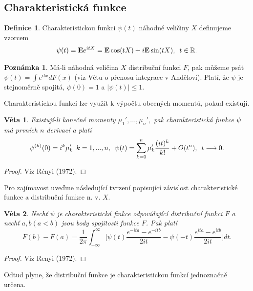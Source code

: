 \documentclass[a4]{report}
\newtheorem{theorem}{Věta}
\theoremstyle{definition}
\newtheorem{definition}{Definice}[section]
\newtheorem{remark}{Poznámka}[section]
\begin{document}
{\subsection{Charakteristická funkce}
\begin{definition}
Charakteristickou funkci $\psi(t)$ náhodné veličiny $X$ definujeme vzorcem
\begin{equation}
\psi(t) = \mathbf{E}e^{itX} = \mathbf{E}\cos(tX) + i\mathbf{E}\sin(tX), \enskip t \in \mathbb{R}.
\end{equation}
\end{definition}

\begin{remark}
Má-li náhodná veličina $X$ distribuční funkci $F$, pak můžeme psát $\psi(t) = \int e^{itx}dF(x)$ (viz Větu o přenosu integrace v Andělovi). Platí, že $\psi$ je stejnoměrně spojitá, $\psi(0) = 1$ a $|\psi(t)| \leq 1$.
\end{remark}

Charakteristickou funkci lze využít k výpočtu obecných momentů, pokud existují.
\begin{theorem}
Existují-li konečné momenty $\mu_{1}', ..., \mu_{n}',$ pak charakteristická funkce $\psi$ má prvních $n$ derivací a platí
\begin{equation}
\psi^{(k)}(0) = i^{k}\mu_{k}' \enskip k = 1, ..., n, \enskip \psi(t) = \sum_{k = 0}^{n}\mu_{k}' \frac{(it)^{k}}{k!} + O(t^{n}), \enskip t \longrightarrow 0.
\end{equation}
\end{theorem}
\begin{proof}
Viz Rényi (1972).
\end{proof}

Pro zajímavost uveďme následující tvrzení popisující závislost charakteristické funkce a distribuční funkce n. v. $X$.
\begin{theorem}
Nechť $\psi$ je charakteristická finkce odpovídající distribuční funkci $F$ a nechť $a, b (a < b)$ jsou body spojitosti funkce $F$. Pak platí
\begin{equation}
F(b) - F(a)  = \frac{1}{2\pi} \int_{-\infty}^{\infty}\bigg[ \psi(t) \frac{e^{-ita}-e^{-itb}}{2it} - \psi(-t)\frac{e^{ita}-e^{itb}}{2it} \bigg] dt.
\end{equation}
\end{theorem}
\begin{proof}
Viz Renyi (1972).
\end{proof}
Odtud plyne, že distribuční funkce je charakteristickou funkcí jednoznačně určena.

}
\end{document}
